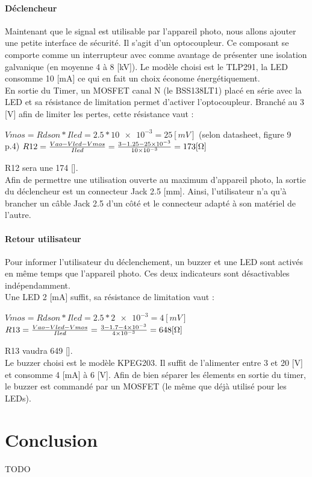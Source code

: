 \documentclass[a4paper,10pt]{article}
\begin{document}
\paragraph{Déclencheur}
Maintenant que le signal est utilisable par l'appareil photo, nous allons ajouter une petite interface de sécurité. Il s'agit d'un optocoupleur. Ce composant se comporte comme un interrupteur avec comme avantage de présenter une isolation galvanique (en moyenne 4 à 8 [kV]). Le modèle choisi est le TLP291, la LED consomme 10 [mA] ce qui en fait un choix économe énergétiquement. \\
En sortie du Timer, un MOSFET canal N (le BSS138LT1) placé en série avec la LED et sa résistance de limitation permet d'activer l'optocoupleur. Branché au 3 [V] afin de limiter les pertes, cette résistance vaut :
\begin{center}
 $ Vmos = Rdson * Iled = 2.5*\num{10e-3} = 25 [mV] $ (selon datasheet, figure 9 p.4)
 $ R12 = \frac{Vao-Vled-Vmos}{Iled} = \frac{3-1.25-\num{25e-3}}{\num{10e-3}} = 173 [\ohm] $
\end{center}
R12 sera une 174 [\ohm].\\
Afin de permettre une utilisation ouverte au maximum d'appareil photo, la sortie du déclencheur est un connecteur Jack 2.5 [mm]. Ainsi, l'utilisateur n'a qu'à brancher un câble Jack 2.5 d'un côté et le connecteur adapté à son matériel de l'autre.

\paragraph{Retour utilisateur}
Pour informer l'utilisateur du déclenchement, un buzzer et une LED sont activés en même temps que l'appareil photo. Ces deux indicateurs sont désactivables indépendamment.\\
Une LED 2 [mA] suffit, sa résistance de limitation vaut :
\begin{center}
 $ Vmos = Rdson * Iled = 2.5*\num{2e-3} = 4 [mV] $
 $ R13 = \frac{Vao-Vled-Vmos}{Iled} = \frac{3-1.7-\num{4e-3}}{\num{4e-3}} = 648 [\ohm] $
\end{center}
R13 vaudra 649 [\ohm].\\
Le buzzer choisi est le modèle KPEG203. Il suffit de l'alimenter entre 3 et 20 [V] et consomme 4 [mA] à 6 [V]. Afin de bien séparer les élements en sortie du timer, le buzzer est commandé par un MOSFET (le même que déjà utilisé pour les LEDs).

 \pagebreak
 \section{Conclusion}
  TODO
 
\end{document}
